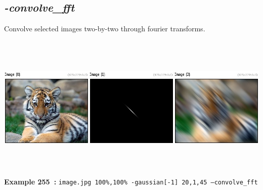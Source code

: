 \documentclass[a4paper,11pt,twoside]{book}
\begin{document}
\subsection{\emph{-convolve\_fft} }\vspace*{-0.5em}
Convolve selected images two-by-two through fourier transforms.
\begin{center}\includegraphics[keepaspectratio=true,height=7cm,width=\textwidth]{img/gmic_def255.jpg}\\
{\footnotesize \textbf{Example 255~:} \texttt{image.jpg 100\%,100\% -gaussian[-1] 20,1,45 --convolve\_fft}}
\end{center}
\end{document}
